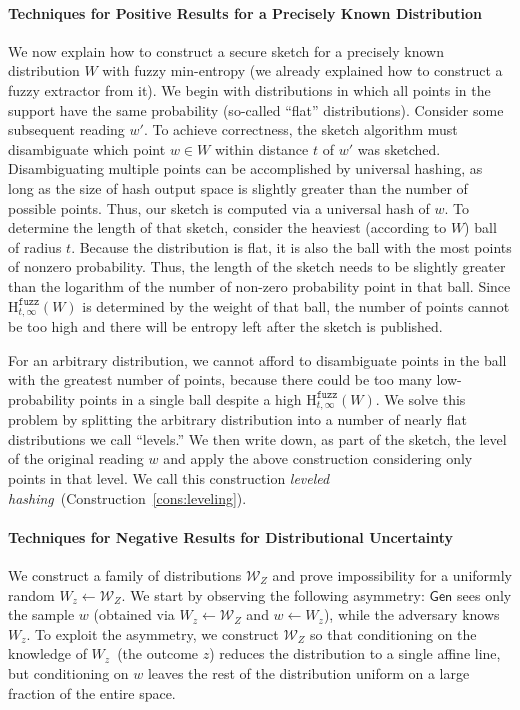 \documentclass[11pt]{article}
\newcommand{\consref}[1]{\mbox{Construction~\ref{#1}}}
\newcommand{\class}[1]{{\ensuremath{\mathsf{#1}}}}
\newcommand{\gen}{\ensuremath{\class{Gen}}\xspace}
\newcommand{\Hfuzz}{\mathrm{H}^{\mathtt{fuzz}}_{t,\infty}}
\begin{document}
\paragraph{Techniques for Positive Results for a Precisely Known Distribution} We now explain how to construct a secure sketch for a precisely known distribution $W$ with fuzzy min-entropy (we already explained how to construct a fuzzy extractor from it).  We begin with distributions in which all points in the support have the same probability (so-called ``flat'' distributions).   Consider some subsequent reading $w'$. To achieve correctness, the sketch algorithm must disambiguate which point $w\in W$ within distance $t$ of $w'$ was sketched. Disambiguating multiple points can be accomplished by universal hashing, as long as the size of hash output space is slightly greater than the number of possible points. Thus, our sketch is computed via a universal hash of $w$. To determine the length of that sketch, consider the heaviest (according to $W$) ball of radius $t$. Because the distribution is flat, it is also the ball with the most points of nonzero probability. Thus, the length of the sketch needs to be slightly greater than the logarithm of the number of non-zero probability point in that ball. Since $\Hfuzz(W)$ is determined by the weight of that ball, the number of points cannot be too high and there will be entropy left after the sketch is published.

For an arbitrary distribution, we cannot afford to disambiguate points in the ball with the greatest number of points, because there could be too many low-probability points in a single ball despite a high $\Hfuzz(W)$.  We solve this problem by splitting the arbitrary distribution into a number of nearly flat distributions we call ``levels.''  We then write down, as part of the sketch, the level of the original reading $w$ and apply the above construction considering only points in that level.  We call this construction \emph{leveled hashing}~(\consref{cons:leveling}).

\paragraph{Techniques for Negative Results for Distributional Uncertainty}
We construct a family of distributions $\mathcal{W}_Z$ and prove impossibility for a uniformly random $W_z \leftarrow \mathcal{W}_Z$.
We start by observing the following asymmetry: $\gen$  sees only the sample $w$ (obtained via $W_z\leftarrow \mathcal{W}_Z$ and $w\leftarrow W_z$), while
the adversary knows $W_z$.   To exploit the asymmetry, we construct $\mathcal{W}_Z$ so that conditioning on the knowledge of $W_z$~(the outcome $z$) reduces the distribution to a single affine line, but conditioning on $w$ leaves the rest of the distribution uniform on a large fraction of the entire space.
\end{document}
